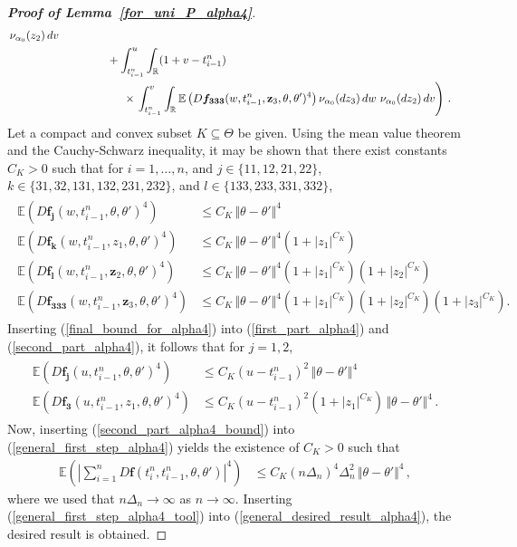 \documentclass[11pt,a4paper]{article}
\newcommand{\alphan}{{\alpha_0}}
\newcommand{\tminus}{{t_{i-1}^n}}
\newcommand{\tplus}{{t_i^n}}
\newcommand{\EE}{{\mathbb E}}
\newcommand{\RR}{{\mathbb R}}
\numberwithin{equation}{section}
\numberwithin{theorem}{section}
\begin{document}
\begin{proof}[\textbf{Proof of Lemma~\ref{for_uni_P_alpha4}}]
\begin{align}
\begin{split}
\,\nu_\alphan(z_2)\, d{v}\\
&\hspace{15mm}+ \int_\tminus^{u} \int_\RR
  (1+{v}-\tminus) \\
&\hspace{20mm}\times\left. \int_\tminus^{v}\int_\RR
\EE\left( D\bm{f_{333}}({w},\tminus,\mathbf{z}_3,
  \theta,\theta')^4\right)\nu_\alphan(dz_3)\, d{w}\,
 \,\nu_\alphan(dz_2)\, d{v}\right)\,.
\end{split}
\end{align}
%
Let a compact and convex subset $K\subseteq \Theta$ be given. Using
  the mean value theorem and the Cauchy-Schwarz inequality, it may be
  shown that there exist constants $C_K>0$ such that
for $i=1,\ldots,n$, and $j \in \{11, 12, 21, 22 \}$, $ k \in \{31, 32, 131, 132, 231,
  232\}$, and $l \in \{133, 233, 331, 332 \}$,
%
\begin{align}
\begin{split}\label{final_bound_for_alpha4}
  \EE\left( D\bm{f_j}({w},\tminus,
  \theta,\theta')^4\right)
&\leq C_{K}\,\Vert
  \theta-\theta'\Vert^4\\
\EE\left( D\bm{f_k}({w},\tminus,z_1,
  \theta,\theta')^4\right) 
&\leq C_{K}\, \Vert
  \theta-\theta'\Vert^4 \left( 1+ |z_1|^{C_K}\right)\\
 \EE\left( D\bm{f_l}({w},\tminus,\mathbf{z}_2,
  \theta,\theta')^4\right)
&\leq C_{K}\,\Vert
  \theta-\theta'\Vert^4 \left( 1+ |z_1|^{C_K}\right)\left( 1+ |z_2|^{C_K}\right)\\
  \EE\left( D\bm{f_{333}}({w},\tminus, \mathbf{z}_3,
  \theta,\theta')^4\right) 
&\leq C_{K}\,\Vert
  \theta-\theta'\Vert^4\left( 1+ |z_1|^{C_K}\right)\left( 1+ |z_2|^{C_K}\right)\left( 1+ |z_3|^{C_K}\right).
\end{split}
\end{align}
%
Inserting (\ref{final_bound_for_alpha4}) into
(\ref{first_part_alpha4}) and (\ref{second_part_alpha4}), it follows that for $j=1,2$,
\begin{align}
\begin{split}
\label{second_part_alpha4_bound}
\EE\left( D\bm{f_j}({u},\tminus,
  \theta,\theta')^4\right)  
&\leq C_K ({u}-\tminus)^2 \,\Vert
\theta-\theta'\Vert^4\\
\EE\left( D\bm{f_3}({u},\tminus, z_1,
  \theta,\theta')^4\right)  
&\leq C_K ({u}-\tminus)^2 \left( 1+ |z_1|^{C_K}\right)\,\Vert
\theta-\theta'\Vert^4\,.
\end{split}
\end{align}
%
Now, inserting (\ref{second_part_alpha4_bound})
into (\ref{general_first_step_alpha4}) yields the existence of
$C_{K}>0$ such that
\begin{align}
\EE\left( \left| \sum_{i=1}^n D\bm{f}(\tplus,\tminus,\theta,\theta')
  \right|^4\right)\label{general_first_step_alpha4_tool} &\leq C_K (n\Delta_n)^4\Delta_n^2 \,\Vert
  \theta-\theta'\Vert^4\,,
\end{align}
%
where we used that $n\Delta_n \to \infty$ as $n\to \infty$. Inserting
(\ref{general_first_step_alpha4_tool}) into (\ref{general_desired_result_alpha4}),
the desired result is obtained. 
\end{proof}
\end{document}
